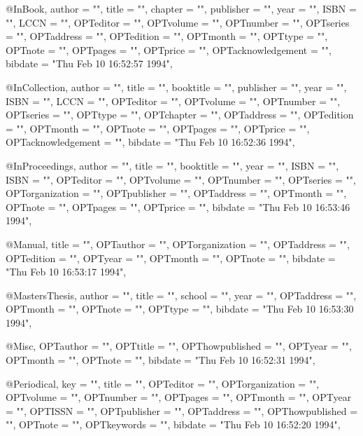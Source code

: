 @InBook{,
  author =       "",
  title =        "",
  chapter =      "",
  publisher =    "",
  year =         "",
  ISBN =         "",
  LCCN =         "",
  OPTeditor =    "",
  OPTvolume =    "",
  OPTnumber =    "",
  OPTseries =    "",
  OPTaddress =   "",
  OPTedition =   "",
  OPTmonth =     "",
  OPTtype =      "",
  OPTnote =      "",
  OPTpages =     "",
  OPTprice =     "",
  OPTacknowledgement = "",
  bibdate =      "Thu Feb 10 16:52:57 1994",
}

@InCollection{,
  author =       "",
  title =        "",
  booktitle =    "",
  publisher =    "",
  year =         "",
  ISBN =         "",
  LCCN =         "",
  OPTeditor =    "",
  OPTvolume =    "",
  OPTnumber =    "",
  OPTseries =    "",
  OPTtype =      "",
  OPTchapter =   "",
  OPTaddress =   "",
  OPTedition =   "",
  OPTmonth =     "",
  OPTnote =      "",
  OPTpages =     "",
  OPTprice =     "",
  OPTacknowledgement = "",
  bibdate =      "Thu Feb 10 16:52:36 1994",
}

@InProceedings{,
  author =       "",
  title =        "",
  booktitle =    "",
  year =         "",
  ISBN =         "",
  ISBN =         "",
  OPTeditor =    "",
  OPTvolume =    "",
  OPTnumber =    "",
  OPTseries =    "",
  OPTorganization = "",
  OPTpublisher = "",
  OPTaddress =   "",
  OPTmonth =     "",
  OPTnote =      "",
  OPTpages =     "",
  OPTprice =     "",
  bibdate =      "Thu Feb 10 16:53:46 1994",
}

@Manual{,
  title =        "",
  OPTauthor =    "",
  OPTorganization = "",
  OPTaddress =   "",
  OPTedition =   "",
  OPTyear =      "",
  OPTmonth =     "",
  OPTnote =      "",
  bibdate =      "Thu Feb 10 16:53:17 1994",
}

@MastersThesis{,
  author =       "",
  title =        "",
  school =       "",
  year =         "",
  OPTaddress =   "",
  OPTmonth =     "",
  OPTnote =      "",
  OPTtype =      "",
  bibdate =      "Thu Feb 10 16:53:30 1994",
}

@Misc{,
  OPTauthor =    "",
  OPTtitle =     "",
  OPThowpublished = "",
  OPTyear =      "",
  OPTmonth =     "",
  OPTnote =      "",
  bibdate =      "Thu Feb 10 16:52:31 1994",
}

@Periodical{,
  key =          "",
  title =        "",
  OPTeditor =    "",
  OPTorganization = "",
  OPTvolume =    "",
  OPTnumber =    "",
  OPTpages =     "",
  OPTmonth =     "",
  OPTyear =      "",
  OPTISSN =      "",
  OPTpublisher = "",
  OPTaddress =   "",
  OPThowpublished = "",
  OPTnote =      "",
  OPTkeywords =  "",
  bibdate =      "Thu Feb 10 16:52:20 1994",
}


